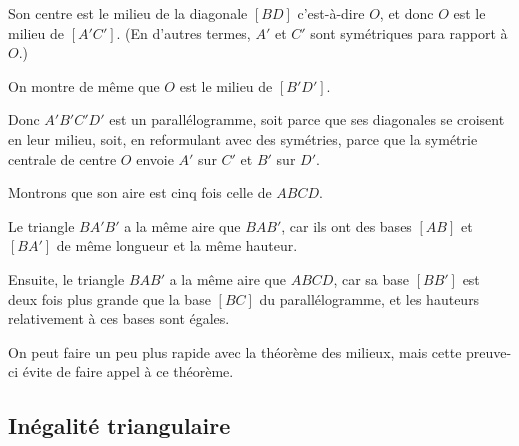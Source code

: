 \begin{exo}
\begin{sol}

Son centre est le milieu de la diagonale $[BD]$ c'est-à-dire $O$, et donc $O$ est le milieu de $[A'C']$. (En d'autres termes, $A'$ et $C'$ sont symétriques para rapport à $O$.)


On montre de même que $O$ est le milieu de $[B'D']$.


Donc $A'B'C'D'$ est un parallélogramme, soit parce que ses diagonales se croisent en leur milieu, soit, en reformulant avec des symétries, parce que la symétrie centrale de centre $O$ envoie $A'$ sur $C'$ et $B'$ sur $D'$.


Montrons que son aire est cinq fois celle de $ABCD$.

Le triangle $BA'B'$ a la même aire que $BAB'$, car ils ont des bases $[AB]$ et $[BA']$ de même longueur et la même hauteur.


Ensuite, le triangle $BAB'$ a la même aire que $ABCD$, car sa base $[BB']$ est deux fois plus grande que la base $[BC]$ du parallélogramme, et les hauteurs relativement à ces bases sont égales.


On peut faire un peu plus rapide avec la théorème des milieux, mais cette preuve-ci évite de faire appel à ce théorème.
\end{sol}
\end{exo}







\subsection{Inégalité triangulaire}

